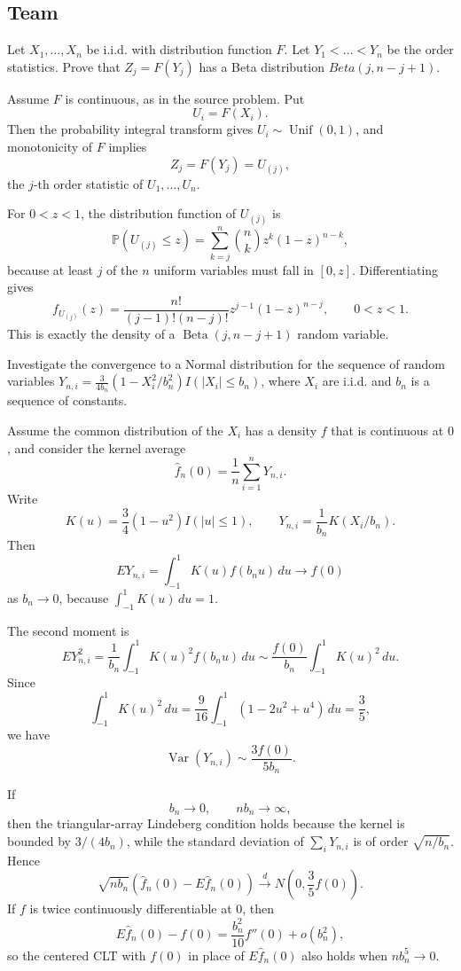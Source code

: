 \subsection{Team}

\begin{exercise}
\label{applied:2010:7}
Let $X_1, \dots, X_n$ be i.i.d. with distribution function $F$. Let $Y_1 < \dots < Y_n$ be the order statistics. Prove that $Z_j = F(Y_j)$ has a Beta distribution $Beta(j, n-j+1)$.
\end{exercise}

\begin{solution}
Assume $F$ is continuous, as in the source problem.  Put
\[
U_i=F(X_i).
\]
Then the probability integral transform gives $U_i\sim \operatorname{Unif}(0,1)$, and monotonicity of $F$ implies
\[
Z_j=F(Y_j)=U_{(j)},
\]
the $j$-th order statistic of $U_1,\ldots,U_n$.

For $0<z<1$, the distribution function of $U_{(j)}$ is
\[
\mathbb{P}(U_{(j)}\leq z)
=\sum_{k=j}^n {n\choose k}z^k(1-z)^{n-k},
\]
because at least $j$ of the $n$ uniform variables must fall in $[0,z]$. Differentiating gives
\[
f_{U_{(j)}}(z)
=\frac{n!}{(j-1)!(n-j)!}z^{j-1}(1-z)^{n-j},
\qquad 0<z<1.
\]
This is exactly the density of a $\operatorname{Beta}(j,n-j+1)$ random variable.
\end{solution}

\begin{exercise}
\label{applied:2010:8}
Investigate the convergence to a Normal distribution for the sequence of random variables $Y_{n,i} = \frac{3}{4b_n}(1 - X_i^2/b_n^2)I(|X_i| \le b_n)$, where $X_i$ are i.i.d. and $b_n$ is a sequence of constants.
\end{exercise}

\begin{solution}
Assume the common distribution of the $X_i$ has a density $f$ that is continuous at $0$, and consider the kernel average
\[
\hat f_n(0)=\frac{1}{n}\sum_{i=1}^n Y_{n,i}.
\]
Write
\[
K(u)=\frac{3}{4}(1-u^2)I(|u|\leq1),
\qquad
Y_{n,i}=\frac{1}{b_n}K(X_i/b_n).
\]
Then
\[
E Y_{n,i}=\int_{-1}^{1}K(u)f(b_nu)\,du\to f(0)
\]
as $b_n\to0$, because $\int_{-1}^{1}K(u)\,du=1$.

The second moment is
\[
E Y_{n,i}^2=\frac{1}{b_n}\int_{-1}^{1}K(u)^2f(b_nu)\,du
\sim \frac{f(0)}{b_n}\int_{-1}^{1}K(u)^2\,du.
\]
Since
\[
\int_{-1}^{1}K(u)^2\,du
=\frac{9}{16}\int_{-1}^{1}(1-2u^2+u^4)\,du
=\frac{3}{5},
\]
we have
\[
\operatorname{Var}(Y_{n,i})\sim \frac{3f(0)}{5b_n}.
\]

If
\[
b_n\to0,\qquad nb_n\to\infty,
\]
then the triangular-array Lindeberg condition holds because the kernel is bounded by $3/(4b_n)$, while the standard deviation of $\sum_i Y_{n,i}$ is of order $\sqrt{n/b_n}$. Hence
\[
\sqrt{nb_n}\left(\hat f_n(0)-E\hat f_n(0)\right)
\xrightarrow{d}N\left(0,\frac{3}{5}f(0)\right).
\]
If $f$ is twice continuously differentiable at $0$, then
\[
E\hat f_n(0)-f(0)=\frac{b_n^2}{10}f''(0)+o(b_n^2),
\]
so the centered CLT with $f(0)$ in place of $E\hat f_n(0)$ also holds when $nb_n^5\to0$.
\end{solution}

